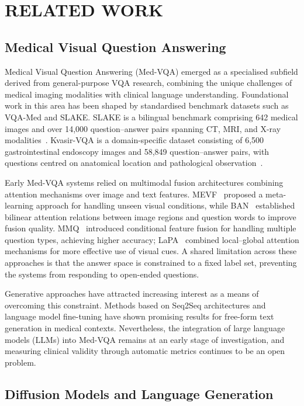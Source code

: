 \documentclass[9pt]{report}
\begin{document}
\chapter{RELATED WORK}
\label{chap:related}

\section{Medical Visual Question Answering}

Medical Visual Question Answering (Med-VQA) emerged as a specialised subfield derived from general-purpose VQA research, combining the unique challenges of medical imaging modalities with clinical language understanding. Foundational work in this area has been shaped by standardised benchmark datasets such as VQA-Med and SLAKE. SLAKE is a bilingual benchmark comprising 642 medical images and over 14,000 question--answer pairs spanning CT, MRI, and X-ray modalities~\cite{slake}. Kvasir-VQA is a domain-specific dataset consisting of 6,500 gastrointestinal endoscopy images and 58,849 question--answer pairs, with questions centred on anatomical location and pathological observation~\cite{kvasir}.

Early Med-VQA systems relied on multimodal fusion architectures combining attention mechanisms over image and text features. MEVF~\cite{mevf} proposed a meta-learning approach for handling unseen visual conditions, while BAN~\cite{ban} established bilinear attention relations between image regions and question words to improve fusion quality. MMQ~\cite{mmq} introduced conditional feature fusion for handling multiple question types, achieving higher accuracy; LaPA~\cite{lapa} combined local--global attention mechanisms for more effective use of visual cues. A shared limitation across these approaches is that the answer space is constrained to a fixed label set, preventing the systems from responding to open-ended questions.

Generative approaches have attracted increasing interest as a means of overcoming this constraint. Methods based on Seq2Seq architectures and language model fine-tuning have shown promising results for free-form text generation in medical contexts. Nevertheless, the integration of large language models (LLMs) into Med-VQA remains at an early stage of investigation, and measuring clinical validity through automatic metrics continues to be an open problem.

\section{Diffusion Models and Language Generation}
\end{document}
